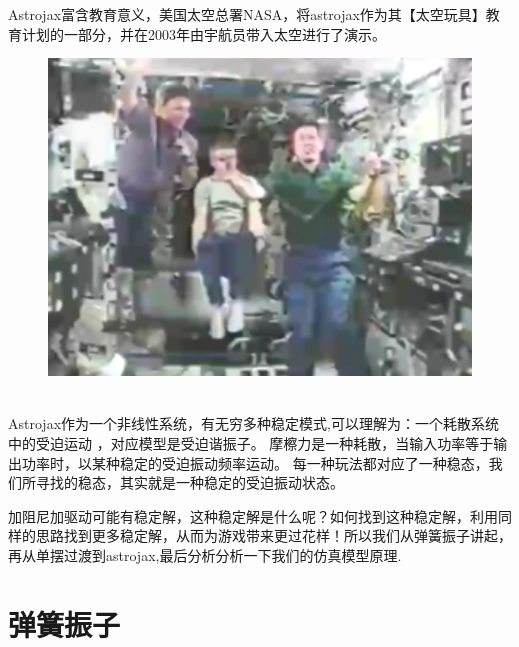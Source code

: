 \documentclass[12pt,a4paper]{ctexart}
\begin{document}
	Astrojax富含教育意义，美国太空总署NASA，将astrojax作为其【太空玩具】教育计划的一部分，并在2003年由宇航员带入太空进行了演示。
		\begin{figure}[h] %
		\centering %
		\includegraphics[scale=0.6]{T801.jpg} %
	\end{figure}%
\\
	\indent Astrojax作为一个非线性系统，有无穷多种稳定模式,可以理解为：一个耗散系统中的受迫运动
	，对应模型是受迫谐振子。
	摩檫力是一种耗散，当输入功率等于输出功率时，以某种稳定的受迫振动频率运动。
	每一种玩法都对应了一种稳态，我们所寻找的稳态，其实就是一种稳定的受迫振动状态。
	
	加阻尼加驱动可能有稳定解，这种稳定解是什么呢？如何找到这种稳定解，利用同样的思路找到更多稳定解，从而为游戏带来更过花样！所以我们从弹簧振子讲起，再从单摆过渡到astrojax,最后分析分析一下我们的仿真模型原理.
	

	
	\section{弹簧振子}
\end{document}
